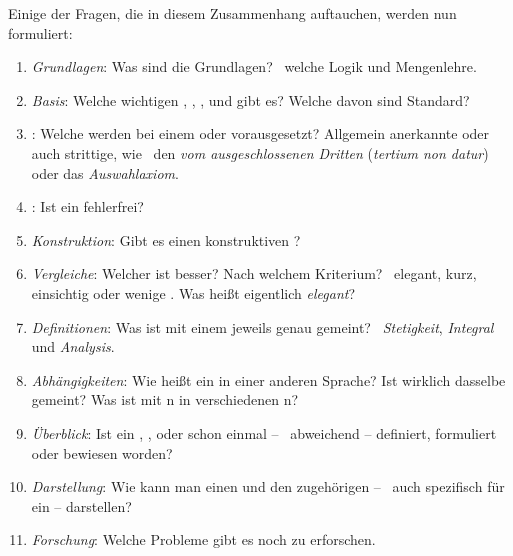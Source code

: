 Einige der Fragen, die in diesem Zusammenhang auftauchen,
werden nun formuliert:
\begin{enumerate}
	\item \label{Frage:Grundlagen} \emph{Grundlagen}:
	Was sind die Grundlagen?
	\textZB\ welche Logik und Mengenlehre.
	\item \label{Frage:Basis} \emph{Basis}:
	Welche wichtigen , , ,  und  gibt es?
	Welche davon sind Standard?
	\item \label{Frage:Axiome} \emph{}:
	Welche  werden bei einem  oder  vorausgesetzt?
	Allgemein anerkannte oder auch strittige, wie \textzB\ den \emph{ vom ausgeschlossenen Dritten} (\emph{tertium non datur}) oder das \emph{Auswahlaxiom}.
	\item \label{Frage:Beweis} \emph{}:
	Ist ein  fehlerfrei?
	\item \label{Frage:Konstruktion} \emph{Konstruktion}:
	Gibt es einen konstruktiven ?
	\item \label{Frage:Vergleiche} \emph{Vergleiche}:
	Welcher  ist besser?
	Nach welchem Kriterium?
	\textZB\ elegant, kurz, einsichtig oder wenige .
	Was heißt eigentlich \emph{elegant}?
	\item \label{Frage:Definitionen} \emph{Definitionen}:
	Was ist mit einem  jeweils genau gemeint?
	\textZB\ \emph{Stetigkeit}, \emph{Integral} und \emph{Analysis}.
	\item \label{Frage:Abhängigkeiten} \emph{Abhängigkeiten}:
	Wie heißt ein  in einer anderen Sprache?
	Ist wirklich dasselbe gemeint?
	Was ist mit n in verschiedenen n?
	\item \label{Frage:Überblick} \emph{Überblick}:
	Ist ein , ,  oder  schon einmal -- \textggf\ abweichend -- definiert, formuliert oder bewiesen worden?
	\item \label{Frage:Darstellung} \emph{Darstellung}:
	Wie kann man einen  und den zugehörigen  -- \textggf\ auch spezifisch für ein  -- darstellen?
	\item \label{Frage:Forschung} \emph{Forschung}:
	Welche Probleme gibt es noch zu erforschen.
\end{enumerate}

